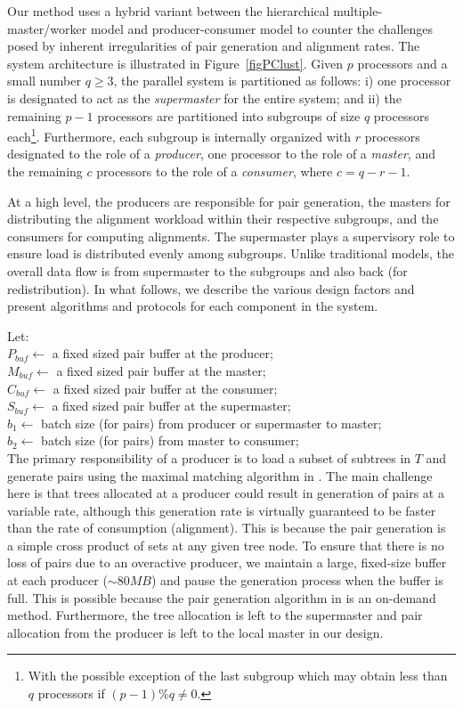 \documentclass[10pt,journal,letterpaper,compsoc]{IEEEtran}
\begin{document}
Our method uses a hybrid variant between the hierarchical multiple-master/worker model and producer-consumer model to counter the challenges posed by inherent irregularities of pair generation and alignment rates. 
The system architecture is illustrated in Figure~\ref{figPClust}.  Given $p$ processors and a small number $q\geq 3$, the parallel system is partitioned as follows: i) one processor is designated to act as the \emph{supermaster} for the entire system; and ii) the remaining $p-1$ processors are partitioned into subgroups of size $q$ processors each\footnote{With the possible exception of the last subgroup which may obtain less than $q$ processors if $(p-1)\%q\ne 0$.}. Furthermore, each subgroup is internally organized with $r$ processors designated to the role of a \emph{producer}, one processor to the role of a \emph{master}, and the remaining $c$ processors to the role of a \emph{consumer}, where $c=q-r-1$. 

At a high level, the producers are responsible for pair generation, the masters for distributing the alignment workload within their respective subgroups, and the consumers for computing alignments. The supermaster plays a supervisory role to ensure load is distributed evenly among subgroups. Unlike traditional models, the overall data flow is from supermaster to the subgroups and also back (for redistribution). In what follows, we describe the various design factors and present algorithms and protocols for each component in the system. 

Let:\\
$P_{buf}\leftarrow$ a fixed sized pair buffer at the producer;\\
$M_{buf}\leftarrow$ a fixed sized pair buffer at the master;\\
$C_{buf}\leftarrow$ a fixed sized pair buffer at the consumer;\\
$S_{buf}\leftarrow$ a fixed sized pair buffer at the supermaster;\\
$b_1\leftarrow$ batch size (for pairs) from producer or supermaster to master;\\
$b_2\leftarrow$ batch size (for pairs) from master to consumer;\\


The primary responsibility of a producer is to load a subset of subtrees in $T$ and generate pairs using the maximal matching algorithm in \cite{Kalyanaraman07}. The main challenge here is that trees allocated at a producer could result in generation of pairs at a variable rate, although this generation rate is virtually guaranteed to be faster than the rate of consumption (alignment). This is because the pair generation is a simple cross product of sets at any given tree node. To ensure that there is no loss of pairs due to an overactive producer, we maintain a large, fixed-size buffer at each producer ($\sim 80MB$) and pause the generation process when the buffer is full. This is possible because the pair generation algorithm in \cite{Kalyanaraman07} is an on-demand method. Furthermore, the tree allocation is left to the supermaster and pair allocation from the producer is left to the local master in our design. 
\end{document}
